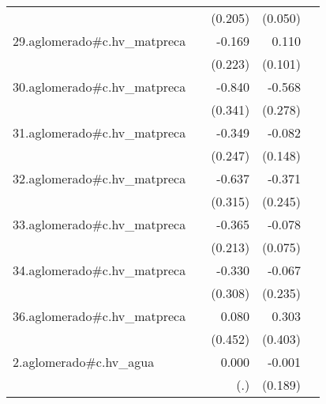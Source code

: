 {\begin{longtable}{l*{4}{D{.}{.}{-1}}}
            &                     &     (0.205)         &     (0.050)         &                     \\
\addlinespace
29.aglomerado#c.hv\_matpreca&                     &      -0.169         &       0.110         &                     \\
            &                     &     (0.223)         &     (0.101)         &                     \\
\addlinespace
30.aglomerado#c.hv\_matpreca&                     &      -0.840\sym{*}  &      -0.568\sym{*}  &                     \\
            &                     &     (0.341)         &     (0.278)         &                     \\
\addlinespace
31.aglomerado#c.hv\_matpreca&                     &      -0.349         &      -0.082         &                     \\
            &                     &     (0.247)         &     (0.148)         &                     \\
\addlinespace
32.aglomerado#c.hv\_matpreca&                     &      -0.637\sym{*}  &      -0.371         &                     \\
            &                     &     (0.315)         &     (0.245)         &                     \\
\addlinespace
33.aglomerado#c.hv\_matpreca&                     &      -0.365         &      -0.078         &                     \\
            &                     &     (0.213)         &     (0.075)         &                     \\
\addlinespace
34.aglomerado#c.hv\_matpreca&                     &      -0.330         &      -0.067         &                     \\
            &                     &     (0.308)         &     (0.235)         &                     \\
\addlinespace
36.aglomerado#c.hv\_matpreca&                     &       0.080         &       0.303         &                     \\
            &                     &     (0.452)         &     (0.403)         &                     \\
\addlinespace
2.aglomerado#c.hv\_agua&                     &       0.000         &      -0.001         &                     \\
            &                     &         (.)         &     (0.189)         &                     \\

\end{longtable}}
